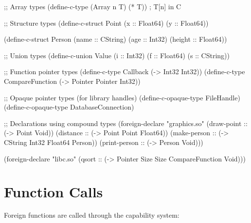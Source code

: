 \begin{example}
\begin{lambdustcode}
;; Array types
(define-c-type (Array n T) (* T))   ; T[n] in C

;; Structure types
(define-c-struct Point  
  (x :: Float64)
  (y :: Float64))

(define-c-struct Person
  (name :: CString)
  (age :: Int32)
  (height :: Float64))

;; Union types  
(define-c-union Value
  (i :: Int32)
  (f :: Float64)
  (s :: CString))

;; Function pointer types
(define-c-type Callback (-> Int32 Int32))
(define-c-type CompareFunction (-> Pointer Pointer Int32))

;; Opaque pointer types (for library handles)
(define-c-opaque-type FileHandle)
(define-c-opaque-type DatabaseConnection)

;; Declarations using compound types
(foreign-declare "graphics.so"
  (draw-point :: (-> Point Void))
  (distance :: (-> Point Point Float64))
  (make-person :: (-> CString Int32 Float64 Person))
  (print-person :: (-> Person Void)))

(foreign-declare "libc.so"
  (qsort :: (-> Pointer Size Size CompareFunction Void)))
\end{lambdustcode}
\end{example}

\section{Function Calls}
\label{sec:ffi-calls}


Foreign functions are called through the capability system:

\begin{grammar}
\end{grammar}

